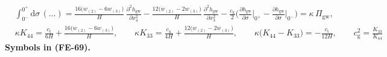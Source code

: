 \documentclass[
  10pt,
]{article}
\begin{document}
\[
\begin{aligned}
&\int_{0^-}^{0^+}\mathrm{d}\sigma\,(\dots) = \frac{16\big(w_{(2)} - 6w_{(3)}\big)}{H}\,\frac{\partial^2h_{\mathrm{gw}}}{\partial x_4^2}
 - \frac{12\big(w_{(2)} - 2w_{(3)}\big)}{H}\,\frac{\partial^2h_{\mathrm{gw}}}{\partial x_3^2}
 - \frac{c_{\mathrm{x}}}{2}\Big(\frac{\partial h_{\mathrm{gw}}}{\partial\sigma}\Big\vert_{0^+} - \frac{\partial h_{\mathrm{gw}}}{\partial\sigma}\Big\vert_{0^-}\Big)
 = \kappa\,\Pi_{\mathrm{gw}},\\
&\kappa K_{44} = \frac{c_{\mathrm{t}}}{6H} + \frac{16\big(w_{(2)} - 6w_{(3)}\big)}{H},\qquad
 \kappa K_{33} = \frac{c_{\mathrm{x}}}{4H} + \frac{12\big(w_{(2)} - 2w_{(3)}\big)}{H},\qquad
 \kappa\big(K_{44} - K_{33}\big) = -\frac{c_{\mathrm{t}}}{12H},\qquad c_{\mathrm{g}}^2 = \frac{K_{33}}{K_{44}}
\end{aligned} \tag{FE-69}
\] \textbf{Symbols in (FE-69).}
\end{document}
